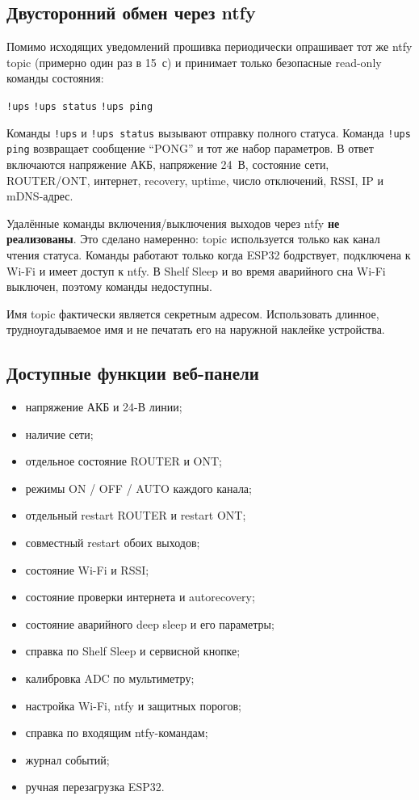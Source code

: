 \documentclass[11pt,a4paper]{article}
\begin{document}
\subsection{Двусторонний обмен через ntfy}
Помимо исходящих уведомлений прошивка периодически опрашивает тот же ntfy topic (примерно один раз в 15~с) и принимает только безопасные read-only команды состояния:
\begin{center}
\texttt{!ups} \qquad \texttt{!ups status} \qquad \texttt{!ups ping}
\end{center}
Команды \texttt{!ups} и \texttt{!ups status} вызывают отправку полного статуса. Команда \texttt{!ups ping} возвращает сообщение ``PONG'' и тот же набор параметров. В ответ включаются напряжение АКБ, напряжение 24~В, состояние сети, ROUTER/ONT, интернет, recovery, uptime, число отключений, RSSI, IP и mDNS-адрес.

Удалённые команды включения/выключения выходов через ntfy \textbf{не реализованы}. Это сделано намеренно: topic используется только как канал чтения статуса. Команды работают только когда ESP32 бодрствует, подключена к Wi-Fi и имеет доступ к ntfy. В Shelf Sleep и во время аварийного сна Wi-Fi выключен, поэтому команды недоступны.

\begin{tcolorbox}[colback=lightaccent,colframe=accent,title=Безопасность ntfy]
Имя topic фактически является секретным адресом. Использовать длинное, трудноугадываемое имя и не печатать его на наружной наклейке устройства.
\end{tcolorbox}

\subsection{Доступные функции веб-панели}
\begin{itemize}[leftmargin=7mm]
  \item напряжение АКБ и 24-В линии;
  \item наличие сети;
  \item отдельное состояние ROUTER и ONT;
  \item режимы ON / OFF / AUTO каждого канала;
  \item отдельный restart ROUTER и restart ONT;
  \item совместный restart обоих выходов;
  \item состояние Wi-Fi и RSSI;
  \item состояние проверки интернета и autorecovery;
  \item состояние аварийного deep sleep и его параметры;
  \item справка по Shelf Sleep и сервисной кнопке;
  \item калибровка ADC по мультиметру;
  \item настройка Wi-Fi, ntfy и защитных порогов;
  \item справка по входящим ntfy-командам;
  \item журнал событий;
  \item ручная перезагрузка ESP32.
\end{itemize}
\end{document}
